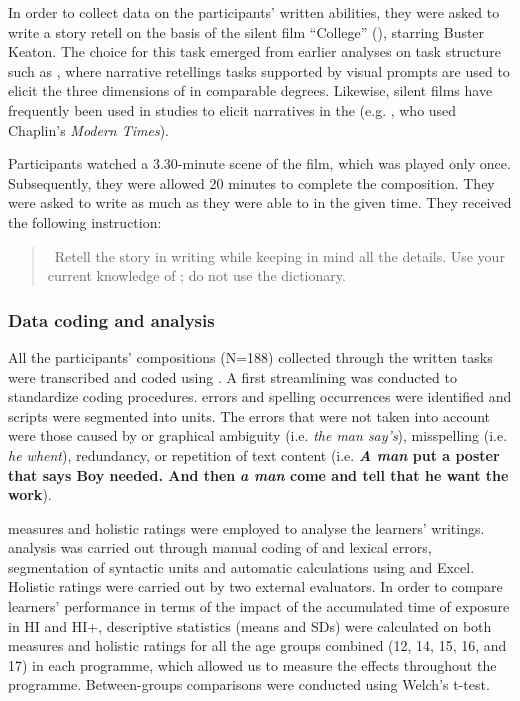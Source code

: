 \documentclass[output=paper]{langsci/langscibook}
\begin{document}

In order to collect data on the participants’ written abilities, they were asked to write a story retell on the basis of the silent film ``College'' (\citealt{Keaton1927}), starring Buster Keaton. The choice for this task emerged from earlier analyses on task structure such as \citet{SkehanFoster1999}, where narrative retellings tasks supported by visual prompts are used to elicit the three dimensions of  in comparable degrees. Likewise, silent films have frequently been used in  studies to elicit narratives in the  (e.g.  \citealt{Lambert1997}, who used Chaplin’s \textit{Modern Times}). 

Participants watched a 3.30-minute scene of the film, which was played only once. Subsequently, they were allowed 20 minutes to complete the composition. They were asked to write as much as they were able to in the given time. They received the following instruction:

\begin{quote}
\ 	Retell the story in writing while keeping in mind all the details. Use 		your current knowledge of ; do not use the dictionary.  
\end{quote}

\subsubsection{Data coding and analysis}

All the participants’ compositions (N=188) collected through the written tasks were transcribed and coded using  \citep{MacWhinney2000}. A first streamlining was conducted to standardize coding procedures.  errors and spelling occurrences were identified and scripts were segmented into units. The errors that were not taken into account were those caused by  or graphical ambiguity (i.e. \textit{the man say's}), misspelling (i.e. \textit{he whent}), redundancy, or repetition of text content (i.e. \textbf{\textit{A man} put a poster that says Boy needed. And then} \textbf{\textit{a man} come and tell that he want the work}). 

 measures and holistic ratings were employed to analyse the learners’ writings.  analysis was carried out through manual coding of  and lexical errors, segmentation of syntactic units and automatic calculations using  and Excel. Holistic ratings were carried out by two external evaluators. In order to compare learners’ performance in terms of the impact of the accumulated time of exposure in HI and HI+,  descriptive statistics (means and SDs) were calculated on both  measures and holistic ratings for all the age groups combined (12, 14, 15, 16, and 17) in each programme, which allowed us to measure the effects throughout the programme. Between-groups comparisons were conducted using Welch’s t-test.
\end{document}
